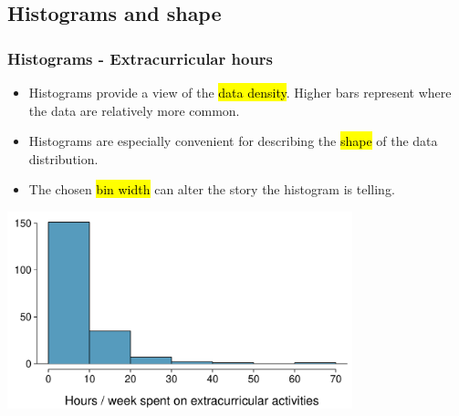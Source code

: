 
\subsection{Histograms and shape}


\begin{frame}[fragile]
\frametitle{Histograms - Extracurricular hours}

\begin{itemize}

\item Histograms provide a view of the \hl{data density}. Higher bars represent where the data are relatively more common.

\item Histograms are especially convenient for describing the \hl{shape} of the data distribution.

\item The chosen \hl{bin width} can alter the story the histogram is telling.

\end{itemize}

\begin{center}
\includegraphics[width=0.75\textwidth]{2-1_numerical_data/figures/extracurr_hrs_hist/extracurr_hrs_hist}
\end{center}

\end{frame}


